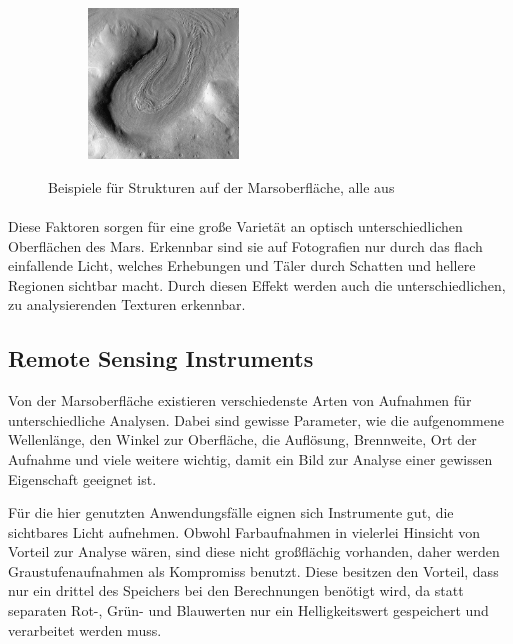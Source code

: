 \begin{figure}[h]
\begin{subfigure}[t]{0.35\textwidth}
		\captionsetup{format=plain}
		\label{fig:ex_graben}
	\end{subfigure}
	\hspace{1cm}
	\begin{subfigure}[t]{0.3\textwidth}
		\centering
		\includegraphics[height=4cm,keepaspectratio]{images/Gre13/Gre13_05.jpg}
		\captionsetup{format=plain}
		\label{fig:ex_glacier}
	\end{subfigure}
	\hfill
	\caption{Beispiele für Strukturen auf der Marsoberfläche, alle aus \cite[Kap.~7]{greeley_13}}
\end{figure}

\paragraph{}
Diese Faktoren sorgen für eine große Varietät an optisch unterschiedlichen Oberflächen des Mars. Erkennbar sind sie auf Fotografien nur durch das flach einfallende Licht, welches Erhebungen und Täler durch Schatten und hellere Regionen sichtbar macht. Durch diesen Effekt werden auch die unterschiedlichen, zu analysierenden Texturen erkennbar.

\subsection{Remote Sensing Instruments}
\label{ssec:mars_images}


Von der Marsoberfläche existieren verschiedenste Arten von Aufnahmen für unterschiedliche Analysen. Dabei sind gewisse Parameter, wie \zB die aufgenommene Wellenlänge, den Winkel zur Oberfläche, die Auflösung, Brennweite, Ort der Aufnahme und viele weitere wichtig, damit ein Bild zur Analyse einer gewissen Eigenschaft geeignet ist.

Für die hier genutzten Anwendungsfälle eignen sich Instrumente gut, die sichtbares Licht aufnehmen. Obwohl Farbaufnahmen in vielerlei Hinsicht von Vorteil zur Analyse wären, sind diese nicht großflächig vorhanden, daher werden Graustufenaufnahmen als Kompromiss benutzt. Diese besitzen den Vorteil, dass nur ein drittel des Speichers bei den Berechnungen benötigt wird, da statt separaten Rot-, Grün- und Blauwerten nur ein Helligkeitswert gespeichert und verarbeitet werden muss.

